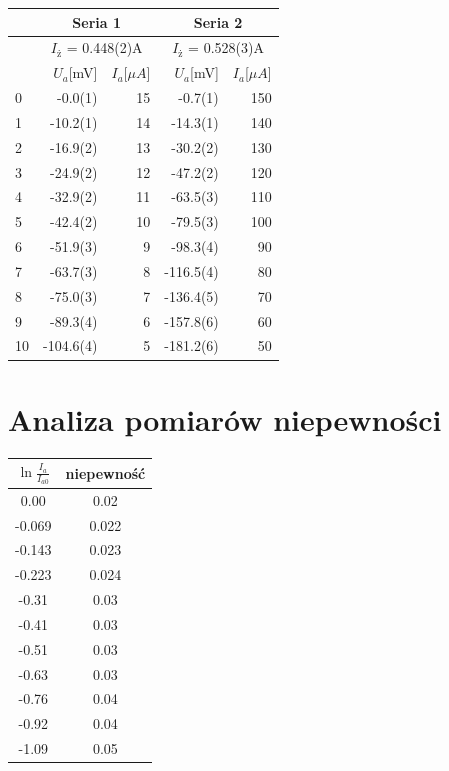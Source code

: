 \documentclass[a4paper,10pt]{article}
\begin{document}
\begin{tabular}{|l|r|r|r|r|}
\hline
&\multicolumn{2}{c|}{Seria 1} &\multicolumn{2}{c|}{Seria 2}\\\hline
 &\multicolumn{2}{c|}{$I_ż$ = 0.448(2)A} &\multicolumn{2}{c|}{$I_ż$ = 0.528(3)A}\\\hline
&  $U_a$[mV] &  $I_a$[$\mu A$] &  $U_a$[mV] &  $I_a$[$\mu A$] \\\hline
0  &     -0.0(1) &        15 &     -0.7(1) &       150 \\\hline
1  &    -10.2(1) &        14 &    -14.3(1) &       140 \\\hline
2  &    -16.9(2) &        13 &    -30.2(2) &       130 \\\hline
3  &    -24.9(2) &        12 &    -47.2(2) &       120 \\\hline
4  &    -32.9(2) &        11 &    -63.5(3) &       110 \\\hline
5  &    -42.4(2) &        10 &    -79.5(3) &       100 \\\hline
6  &    -51.9(3) &         9 &    -98.3(4) &        90 \\\hline
7  &    -63.7(3) &         8 &   -116.5(4) &        80 \\\hline
8  &    -75.0(3) &         7 &   -136.4(5) &        70 \\\hline
9  &    -89.3(4) &         6 &   -157.8(6) &        60 \\\hline
10 &   -104.6(4) &         5 &   -181.2(6) &        50 \\\hline
\end{tabular}

\section{Analiza pomiarów niepewności}
\begin{center}
\begin{tabular}{|c c|}
  \hline
  $\ln{\frac{I_a}{I_{a0}}}$& niepewność \\
  \hline
   0.00  &0.02  \\\hline
  -0.069 &0.022 \\\hline
  -0.143 &0.023 \\\hline
  -0.223 &0.024 \\\hline
  -0.31  &0.03  \\\hline
  -0.41  &0.03  \\\hline
  -0.51  &0.03\\\hline
  -0.63  &0.03\\\hline
  -0.76  &0.04\\\hline
  -0.92  &0.04\\\hline
  -1.09  &0.05\\\hline
\end{tabular}
\end{center}
\end{document}
